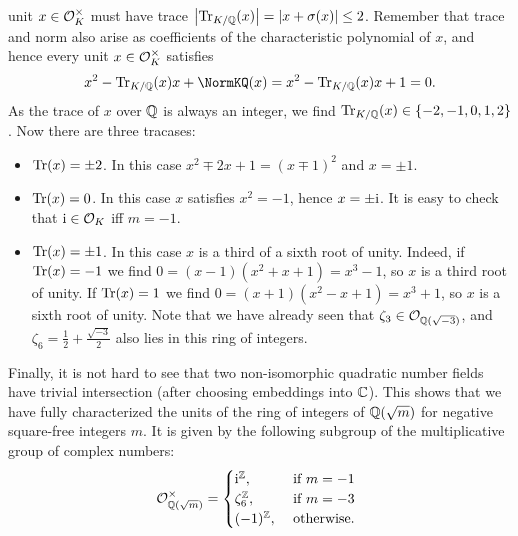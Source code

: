 \documentclass[a4paper,11pt]{article}
\begin{document}
\begin{enumerate}
        unit $x \in \mathcal{O}_K^\times$ must have trace $\left\lvert \operatorname{Tr}_{K/\mathbb{Q}}(x) \right\rvert = \left\lvert x +
        \sigma(x) \right\rvert \leq 2$. Remember that trace and norm also arise as coefficients
        of the characteristic polynomial of $x$, and hence every unit
        $x \in \mathcal{O}_K^\times$ satisfies
        \begin{equation*}
            x^2 - \Tr_{K/\Q}(x) x + \NormKQ(x) = x^2 - \Tr_{K/\Q}(x) x + 1 = 0.
        \end{equation*}
        As the trace of $x$ over $\mathbb{Q}$ is always an integer, we find 
        $\operatorname{Tr}_{K/\mathbb{Q}}(x) \in \{-2,-1,0,1,2\}$. 
        Now there are three tracases:
        \begin{itemize}
            \item $\operatorname{Tr}(x) = \pm 2$. In this case $x^2 \mp 2x + 1 = (x \mp 1)^2$
                and $x = \pm 1$. 
            \item $\operatorname{Tr}(x) = 0$. In this case $x$ satisfies $x^2 = -1$, hence
                $x = \pm \mathrm i$. It is easy to check that $\mathrm i \in \mathcal{O}_K$ iff 
                $m = -1$. 
            \item $\operatorname{Tr}(x) = \pm 1$. In this case $x$ is a third of a sixth root of
                unity. Indeed, if $\operatorname{Tr}(x) = -1$ we find $0 = (x-1)(x^2 + x + 1)
                = x^3 - 1$, so $x$ is a third root of unity. If $\operatorname{Tr}(x) = 1$ we
                find $0 = (x+1)(x^2 - x + 1) = x^3 + 1$, so $x$ is a sixth root
                of unity. Note that we have already seen that $\zeta_3 \in
                \mathcal{O}_{\mathbb{Q}(\sqrt{-3})}$, and $\zeta_6 = \frac 12 +
                \frac{\sqrt{-3}}2$ also lies in this ring of integers.  
        \end{itemize}
        Finally, it is not hard to see that two non-isomorphic quadratic number
        fields have trivial intersection (after choosing embeddings into $\mathbb{C}$).
        This shows that we have fully characterized the units of
        the ring of integers of $\mathbb{Q}(\sqrt m)$ for negative square-free integers $m$. 
        It is given by the following subgroup of the multiplicative group of
        complex numbers:
        \begin{equation*}
            \mathcal{O}_{\mathbb{Q}(\sqrt m)}^\times = \begin{cases}
                \mathrm i^{\mathbb{Z}}, &\text{ if }m = -1\\
                \zeta_6^{\mathbb{Z}}, &\text{ if }m = -3\\
                (-1)^{\mathbb{Z}}, &\text{ otherwise. }
            \end{cases}
        \end{equation*}



\end{enumerate}
\end{document}
